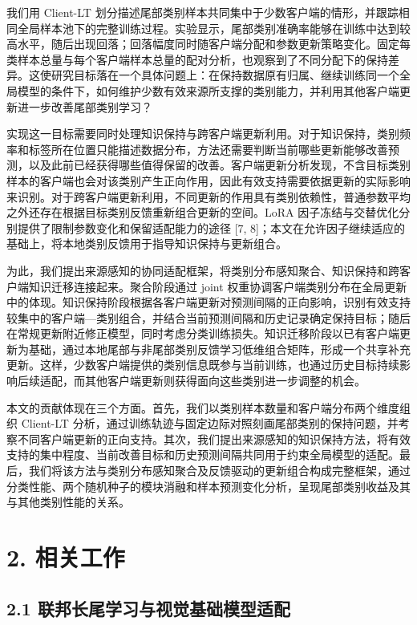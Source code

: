 \documentclass[UTF8,a4paper,10pt,fontset=fandol]{ctexart}
\begin{document}
我们用 Client-LT 划分描述尾部类别样本共同集中于少数客户端的情形，并跟踪相同全局样本池下的完整训练过程。实验显示，尾部类别准确率能够在训练中达到较高水平，随后出现回落；回落幅度同时随客户端分配和参数更新策略变化。固定每类样本总量与每个客户端样本总量的配对分析，也观察到了不同分配下的保持差异。这使研究目标落在一个具体问题上：在保持数据原有归属、继续训练同一个全局模型的条件下，如何维护少数有效来源所支撑的类别能力，并利用其他客户端更新进一步改善尾部类别学习？


实现这一目标需要同时处理知识保持与跨客户端更新利用。对于知识保持，类别频率和标签所在位置只能描述数据分布，方法还需要判断当前哪些更新能够改善预测，以及此前已经获得哪些值得保留的改善。客户端更新分析发现，不含目标类别样本的客户端也会对该类别产生正向作用，因此有效支持需要依据更新的实际影响来识别。对于跨客户端更新利用，不同更新的作用具有类别依赖性，普通参数平均之外还存在根据目标类别反馈重新组合更新的空间。LoRA 因子冻结与交替优化分别提供了限制参数变化和保留适配能力的途径 [7, 8]；本文在允许因子继续适应的基础上，将本地类别反馈用于指导知识保持与更新组合。


为此，我们提出来源感知的协同适配框架，将类别分布感知聚合、知识保持和跨客户端知识迁移连接起来。聚合阶段通过 joint 权重协调客户端类别分布在全局更新中的体现。知识保持阶段根据各客户端更新对预测间隔的正向影响，识别有效支持较集中的客户端—类别组合，并结合当前预测间隔和历史记录确定保持目标；随后在常规更新附近修正模型，同时考虑分类训练损失。知识迁移阶段以已有客户端更新为基础，通过本地尾部与非尾部类别反馈学习低维组合矩阵，形成一个共享补充更新。这样，少数客户端提供的类别信息既参与当前训练，也通过历史目标持续影响后续适配，而其他客户端更新则获得面向这些类别进一步调整的机会。


本文的贡献体现在三个方面。首先，我们以类别样本数量和客户端分布两个维度组织 Client-LT 分析，通过训练轨迹与固定边际对照刻画尾部类别的保持问题，并考察不同客户端更新的正向支持。其次，我们提出来源感知的知识保持方法，将有效支持的集中程度、当前改善目标和历史预测间隔共同用于约束全局模型的适配。最后，我们将该方法与类别分布感知聚合及反馈驱动的更新组合构成完整框架，通过分类性能、两个随机种子的模块消融和样本预测变化分析，呈现尾部类别收益及其与其他类别性能的关系。


\section*{2. 相关工作}

\subsection*{2.1 联邦长尾学习与视觉基础模型适配}
\end{document}
